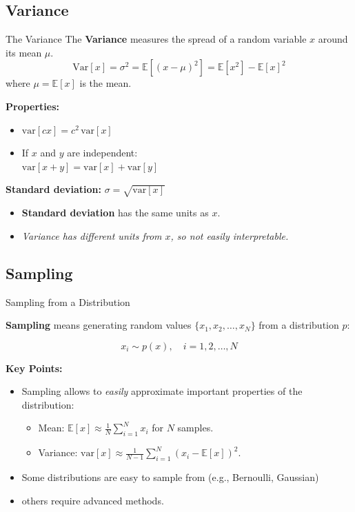 \documentclass{beamer}
\begin{document}
\subsection{Variance}
\begin{frame}{The Variance}
The \textbf{Variance} measures the spread of a random variable $x$ around its mean $\mu$.
\[
\text{Var}[x] = \sigma^2 = \mathbb{E}\left[(x - \mu)^2\right] = \mathbb{E}[x^2] - \mathbb{E}[x]^2
\]
where $\mu = \mathbb{E}[x]$ is the mean.

\vspace{1em}
\textbf{Properties:}
\begin{itemize}
  \item $\text{var}[cx] = c^2 \, \text{var}[x]$
  \item If $x$ and $y$ are independent: \\
    $\text{var}[x + y] = \text{var}[x] + \text{var}[y]$
\end{itemize}

\vspace{0.5em}
\textbf{Standard deviation:} $\sigma = \sqrt{\text{var}[x]}$
\begin{itemize}
\item \textbf{Standard deviation} has the same units as $x$.
\item \textit{Variance has different units from $x$, so not easily interpretable.}
\end{itemize}
\end{frame}

\subsection{Sampling}

\begin{frame}{Sampling from a Distribution}

  \textbf{Sampling} means generating random values $\{x_1, x_2, \ldots, x_N\}$ from a distribution $p$:

\[
x_i \sim p(x), \quad i = 1, 2, \ldots, N
\]

\textbf{Key Points:}
\begin{itemize}
  \item Sampling allows to \textit{easily} approximate important properties of the distribution:
    \begin{itemize}
      \item Mean: $\mathbb{E}[x] \approx \frac{1}{N} \sum_{i=1}^{N} x_i$ for $N$ samples.
      \item Variance: $\text{var}[x] \approx \frac{1}{N-1} \sum_{i=1}^{N} (x_i - \mathbb{E}[x])^2$.
      \end{itemize}
    \item Some distributions are easy to sample from (e.g., Bernoulli, Gaussian)
    \item others require advanced methods.
      \end{itemize}
\end{frame}
\end{document}
